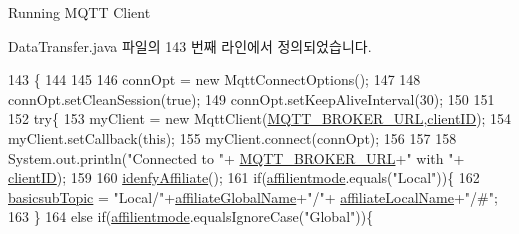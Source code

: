 Running M\+Q\+TT Client 



Data\+Transfer.\+java 파일의 143 번째 라인에서 정의되었습니다.


\begin{DoxyCode}
143                            \{
144     
145         
146         connOpt = \textcolor{keyword}{new} MqttConnectOptions();
147         
148         connOpt.setCleanSession(\textcolor{keyword}{true});  
149         connOpt.setKeepAliveInterval(30); 
150         
151         
152         \textcolor{keywordflow}{try}\{
153             myClient = \textcolor{keyword}{new} MqttClient(\mbox{\hyperlink{classcom_1_1github_1_1aites_1_1framework_1_1communicate_1_1_data_transfer_a379ab24ad1b3894585dc42b93a1ab612}{MQTT\_BROKER\_URL}},\mbox{\hyperlink{classcom_1_1github_1_1aites_1_1framework_1_1communicate_1_1_data_transfer_a5aa04d84db8a69443856393e4fcaa941}{clientID}});
154             myClient.setCallback(\textcolor{keyword}{this});
155             myClient.connect(connOpt);
156             
157         
158             System.out.println(\textcolor{stringliteral}{"Connected to "}+ \mbox{\hyperlink{classcom_1_1github_1_1aites_1_1framework_1_1communicate_1_1_data_transfer_a379ab24ad1b3894585dc42b93a1ab612}{MQTT\_BROKER\_URL}}+\textcolor{stringliteral}{" with "}+
      \mbox{\hyperlink{classcom_1_1github_1_1aites_1_1framework_1_1communicate_1_1_data_transfer_a5aa04d84db8a69443856393e4fcaa941}{clientID}});
159         
160             \mbox{\hyperlink{classcom_1_1github_1_1aites_1_1framework_1_1communicate_1_1_data_transfer_ab7f4dcfffcf7bf80fcee0e4d6cd1b1cc}{idenfyAffiliate}}();
161             \textcolor{keywordflow}{if}(\mbox{\hyperlink{classcom_1_1github_1_1aites_1_1framework_1_1communicate_1_1_data_transfer_a15377742659a03248cb9cbdd4f691386}{affilientmode}}.equals(\textcolor{stringliteral}{"Local"}))\{
162                  \mbox{\hyperlink{classcom_1_1github_1_1aites_1_1framework_1_1communicate_1_1_data_transfer_a0b644afb1ba2329f302a84a4ca2b8343}{basicsubTopic}} = \textcolor{stringliteral}{"Local/"}+\mbox{\hyperlink{classcom_1_1github_1_1aites_1_1framework_1_1communicate_1_1_data_transfer_a5333e287369f5f20c62e28cd80fe0398}{affiliateGlobalName}}+\textcolor{stringliteral}{"/"}+
      \mbox{\hyperlink{classcom_1_1github_1_1aites_1_1framework_1_1communicate_1_1_data_transfer_ab8a15f7b2842b32c96bfedefe974ee59}{affiliateLocalName}}+\textcolor{stringliteral}{"/#"};
163              \}
164              \textcolor{keywordflow}{else} \textcolor{keywordflow}{if}(\mbox{\hyperlink{classcom_1_1github_1_1aites_1_1framework_1_1communicate_1_1_data_transfer_a15377742659a03248cb9cbdd4f691386}{affilientmode}}.equalsIgnoreCase(\textcolor{stringliteral}{"Global"}))\{

\end{DoxyCode}
